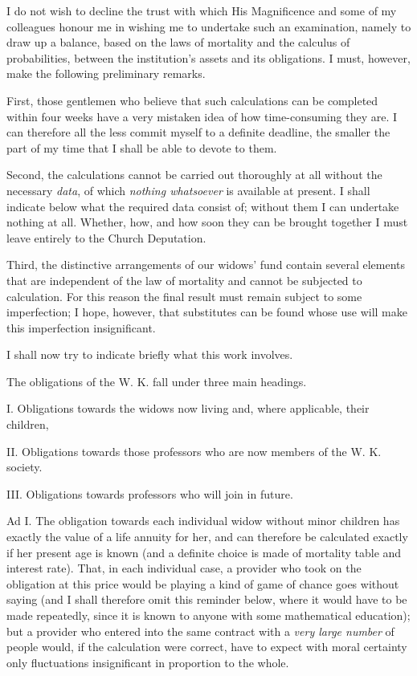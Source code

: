 I do not wish to decline the trust with which His Magnificence and some of my colleagues honour me in wishing me to undertake such an examination, namely to draw up a balance, based on the laws of mortality and the calculus of probabilities, between the institution's assets and its obligations. I must, however, make the following preliminary remarks.

First, those gentlemen who believe that such calculations can be completed within four weeks have a very mistaken idea of how time-consuming they are. I can therefore all the less commit myself to a definite deadline, the smaller the part of my time that I shall be able to devote to them.

Second, the calculations cannot be carried out thoroughly at all without the necessary \textit{data}, of which \textit{nothing whatsoever} is available at present. I shall indicate below what the required data consist of; without them I can undertake nothing at all. Whether, how, and how soon they can be brought together I must leave entirely to the Church Deputation.

Third, the distinctive arrangements of our widows' fund contain several elements that are independent of the law of mortality and cannot be subjected to calculation. For this reason the final result must remain subject to some imperfection; I hope, however, that substitutes can be found whose use will make this imperfection insignificant.

I shall now try to indicate briefly what this work involves.

\par{}
The obligations of the W. K. fall under three main headings.

I. Obligations towards the widows now living and, where applicable, their children,

II. Obligations towards those professors who are now members of the W. K. society.

III. Obligations towards professors who will join in future.

Ad I. The obligation towards each individual widow without minor children has exactly the value of a life annuity for her, and can therefore be calculated exactly if her present age is known (and a definite choice is made of mortality table and interest rate). That, in each individual case, a provider who took on the obligation at this price would be playing a kind of game of chance goes without saying (and I shall therefore omit this reminder below, where it would have to be made repeatedly, since it is known to anyone with some mathematical education); but a provider who entered into the same contract with a \textit{very large number} of people would, if the calculation were correct, have to expect with moral certainty only fluctuations insignificant in proportion to the whole.

